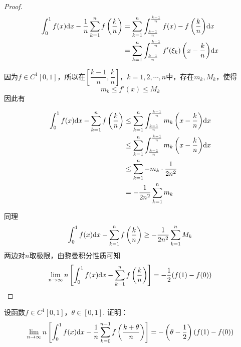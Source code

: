 \begin{proof}
    
    \begin{align*}
        \int_{0}^{1}{f(x)}\mathrm{d} x - \dfrac{1}{n}\sum\limits_{k = 1}^{n}{f\left( \dfrac{k}{n} \right)} & = \sum\limits_{k = 1}^{n}{\int_{\frac{k - 1}{n}}^{\frac{k - 1}{n}}{f(x) - f\left( \dfrac{k}{n} \right)}\mathrm{d} x} \\
        & = \sum\limits_{k = 1}^{n}{\int_{\frac{k - 1}{n}}^{\frac{k - 1}{n}}{f'(\xi_k)\left( x - \dfrac{k}{n} \right)}\mathrm{d} x} \\
    \end{align*}
    
    因为$f \in C^{1}[0, 1]$，所以在$\left[ \dfrac{k - 1}{n}, \dfrac{k}{n} \right]$，$k = 1, 2, \cdots, n$中，存在$m_k, M_k$，使得
    \[m_k \leq f'(x) \leq M_k\]
    因此有

    \begin{align*}
        \int_{0}^{1}{f(x)}\mathrm{d} x - \sum\limits_{k = 1}^{n}{f\left( \dfrac{k}{n} \right)} & \leq \sum\limits_{k = 1}^{n}{\int_{\frac{k - 1}{n}}^{\frac{k - 1}{n}}{m_k\left( x - \dfrac{k}{n} \right)}\mathrm{d} x} \\
        & \leq \sum\limits_{k = 1}^{n}{\int_{\frac{k - 1}{n}}^{\frac{k - 1}{n}}{m_k\left( x - \dfrac{k}{n} \right)}\mathrm{d} x} \\
        & \leq \sum\limits_{k = 1}^{n}{-m_k \cdot \dfrac{1}{2n^2}} \\
        & = - \dfrac{1}{2n^2} \sum\limits_{k = 1}^{n}{m_k}
    \end{align*}

    同理
    \[\int_{0}^{1}{f(x)}\mathrm{d} x - \sum\limits_{k = 1}^{n}{f\left( \dfrac{k}{n} \right)} \geq - \dfrac{1}{2n^2} \sum\limits_{k = 1}^{n}{M_k}\]
    两边对$n$取极限，由黎曼积分性质可知
    \[\lim\limits_{n \to \infty}{n \left[ \int_{0}^{1}{f(x)}\mathrm{d} x - \sum\limits_{k = 1}^{n}{f\left( \dfrac{k}{n} \right)} \right]} = -\dfrac{1}{2}(f(1) - f(0))\]
    
\end{proof}

\begin{proposition}
    
    设函数$f \in C^{1}[0, 1]$，$\theta \in [0, 1]$. 证明：
    \[\lim\limits_{n \to \infty}{n \left[ \int_{0}^{1}{f(x)}\mathrm{d} x - \dfrac{1}{n}\sum\limits_{k = 0}^{n - 1}{f\left( \dfrac{k + \theta}{n} \right)} \right]} = -\left( \theta - \dfrac{1}{2} \right) (f(1) - f(0))\]
\end{proposition}

